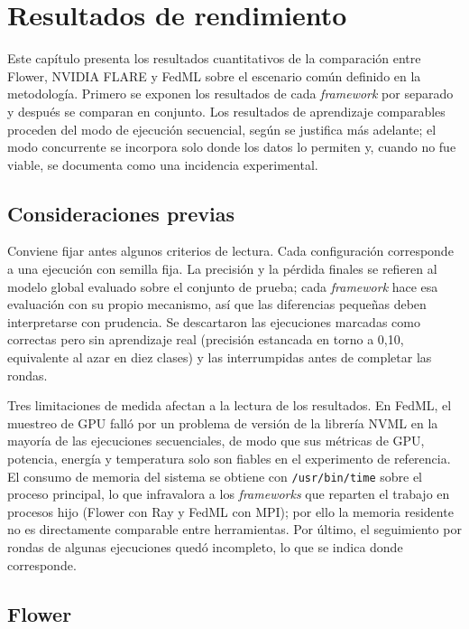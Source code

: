 \chapter{Resultados de rendimiento}\label{chap:resultados-rendimiento}

Este capítulo presenta los resultados cuantitativos de la comparación entre Flower, NVIDIA
FLARE y FedML sobre el escenario común definido en la metodología. Primero se exponen los
resultados de cada \textit{framework} por separado y después se comparan en conjunto. Los
resultados de aprendizaje comparables proceden del modo de ejecución secuencial, según se
justifica más adelante; el modo concurrente se incorpora solo donde los datos lo permiten y,
cuando no fue viable, se documenta como una incidencia experimental.

\section{Consideraciones previas}\label{sec:consideraciones-resultados}

Conviene fijar antes algunos criterios de lectura. Cada configuración corresponde a una
ejecución con semilla fija. La precisión y la pérdida finales se refieren al modelo global
evaluado sobre el conjunto de prueba; cada \textit{framework} hace esa evaluación con su propio
mecanismo, así que las diferencias pequeñas deben interpretarse con prudencia. Se descartaron
las ejecuciones marcadas como correctas pero sin aprendizaje real (precisión estancada en torno
a 0{,}10, equivalente al azar en diez clases) y las interrumpidas antes de completar las
rondas.

Tres limitaciones de medida afectan a la lectura de los resultados. En FedML, el muestreo de GPU
falló por un problema de versión de la librería NVML en la mayoría de las ejecuciones
secuenciales, de modo que sus métricas de GPU, potencia, energía y temperatura solo son fiables
en el experimento de referencia. El consumo de memoria del sistema se obtiene con
\texttt{/usr/bin/time} sobre el proceso principal, lo que infravalora a los \textit{frameworks}
que reparten el trabajo en procesos hijo (Flower con Ray y FedML con MPI); por ello la memoria
residente no es directamente comparable entre herramientas. Por último, el seguimiento por
rondas de algunas ejecuciones quedó incompleto, lo que se indica donde corresponde.

\section{Flower}\label{sec:resultados-flower}


